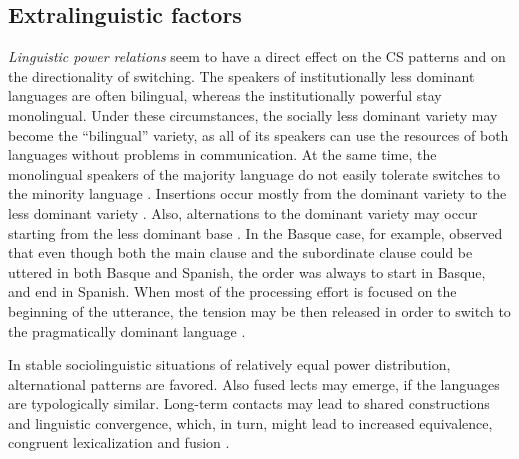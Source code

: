 \documentclass[output=paper]{langscibook}
\begin{document}
\subsection{Extralinguistic factors}

\textit{Linguistic power relations} seem to have a direct effect on the CS patterns and on the directionality of switching. The speakers of institutionally less dominant languages are often bilingual, whereas the institutionally powerful stay monolingual. Under these circumstances, the socially less dominant variety may become the “bilingual” variety, as all of its speakers can use the resources of both languages without problems in communication. At the same time, the monolingual speakers of the majority language do not easily tolerate switches to the minority language \parencite{matras2009language}. Insertions occur mostly from the dominant variety to the less dominant variety \parencite{muysken2000}. Also, alternations to the dominant variety may occur starting from the less dominant base \parencite[14]{gardner2009code}. In the Basque case, for example, \textcite{aurrekoetxea2011perpaus} observed that even though both the main clause and the subordinate clause could be uttered in both Basque and Spanish, the order was always to start in Basque, and end in Spanish.  When most of the processing effort is focused on the beginning of the utterance, the tension may be then released in order to switch to the pragmatically dominant language \parencite{matras2009language}.

In stable sociolinguistic situations of relatively equal power distribution, alternational patterns are favored. Also fused lects may emerge, if the languages are typologically similar. Long-term contacts may lead to shared constructions and linguistic convergence, which, in turn, might lead to increased equivalence, congruent lexicalization and fusion \parencite{auer1999codeswitching,muysken2000,muysken2013language}. 
\end{document}
